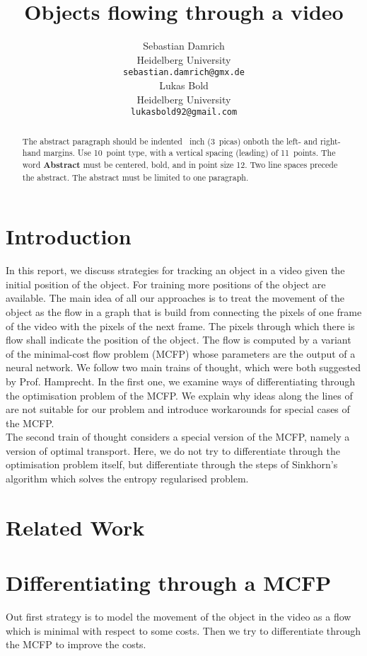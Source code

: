 \documentclass{article}
\title{Objects flowing through a video}
\author{
	Sebastian Damrich 
    \\
  Heidelberg University\\
  \texttt{sebastian.damrich@gmx.de} \\
   \And
   Lukas Bold  \\
   Heidelberg University \\
  \texttt{lukasbold92@gmail.com} \\
}
\begin{document}

\maketitle

\begin{abstract}
  The abstract paragraph should be indented ~inch
  (3~picas) onboth the left- and right-hand margins. Use 10~point
  type, with a vertical spacing (leading) of 11~points.  The word
  \textbf{Abstract} must be centered, bold, and in point size 12. Two
  line spaces precede the abstract. The abstract must be limited to
  one paragraph.
\end{abstract}


\section{Introduction}
In this report, we discuss strategies for tracking an object in a video given the initial position of the object. For training more positions of the object are available. The main idea of all our approaches is to treat the movement of the object as the flow in a graph that is build from connecting the pixels of one frame of the video with the pixels of the next frame. The pixels through which there is flow shall indicate the position of the object. The flow is computed by a variant of the minimal-cost flow problem (MCFP) whose parameters are the output of a neural network. We follow two main trains of thought, which were both suggested by Prof. Hamprecht. In the first one, we examine ways of differentiating through the optimisation problem of the MCFP. We explain why ideas along the lines of \cite{AmosK17} are not suitable for our problem and introduce workarounds for special cases of the MCFP.\\
The second train of thought considers a special version of the MCFP, namely a version of optimal transport. Here, we do not try to differentiate through the optimisation problem itself, but differentiate through the steps of Sinkhorn's algorithm which solves the entropy regularised problem.

\section{Related Work}

\section{Differentiating through a MCFP}
Out first strategy is to model the movement of the object in the video as a flow which is minimal with respect to some costs. Then we try to differentiate through the MCFP to improve the costs.
\end{document}
